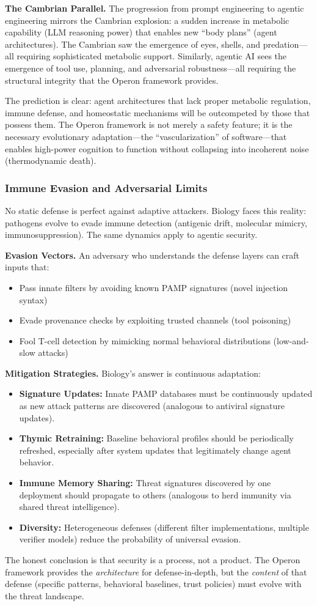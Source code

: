 \textbf{The Cambrian Parallel.} The progression from prompt engineering to agentic engineering mirrors the
Cambrian explosion: a sudden increase in metabolic capability (LLM reasoning power) that enables new
``body plans'' (agent architectures). The Cambrian saw the emergence of eyes, shells, and predation---all
requiring sophisticated metabolic support. Similarly, agentic AI sees the emergence of tool use, planning,
and adversarial robustness---all requiring the structural integrity that the Operon framework provides.

The prediction is clear: agent architectures that lack proper metabolic regulation, immune defense, and
homeostatic mechanisms will be outcompeted by those that possess them. The Operon framework is not merely
a safety feature; it is the necessary evolutionary adaptation---the ``vascularization'' of software---that
enables high-power cognition to function without collapsing into incoherent noise (thermodynamic death).

\subsubsection{Immune Evasion and Adversarial Limits}

No static defense is perfect against adaptive attackers. Biology faces this reality: pathogens evolve
to evade immune detection (antigenic drift, molecular mimicry, immunosuppression). The same dynamics
apply to agentic security.

\textbf{Evasion Vectors.} An adversary who understands the defense layers can craft inputs that:
\begin{itemize}[leftmargin=*]
\item Pass innate filters by avoiding known PAMP signatures (novel injection syntax)
\item Evade provenance checks by exploiting trusted channels (tool poisoning)
\item Fool T-cell detection by mimicking normal behavioral distributions (low-and-slow attacks)
\end{itemize}

\textbf{Mitigation Strategies.} Biology's answer is continuous adaptation:
\begin{itemize}[leftmargin=*]
\item \textbf{Signature Updates:} Innate PAMP databases must be continuously updated as new attack
patterns are discovered (analogous to antiviral signature updates).
\item \textbf{Thymic Retraining:} Baseline behavioral profiles should be periodically refreshed,
especially after system updates that legitimately change agent behavior.
\item \textbf{Immune Memory Sharing:} Threat signatures discovered by one deployment should propagate
to others (analogous to herd immunity via shared threat intelligence).
\item \textbf{Diversity:} Heterogeneous defenses (different filter implementations, multiple verifier
models) reduce the probability of universal evasion.
\end{itemize}

The honest conclusion is that security is a process, not a product. The Operon framework provides the
\textit{architecture} for defense-in-depth, but the \textit{content} of that defense (specific patterns,
behavioral baselines, trust policies) must evolve with the threat landscape.
